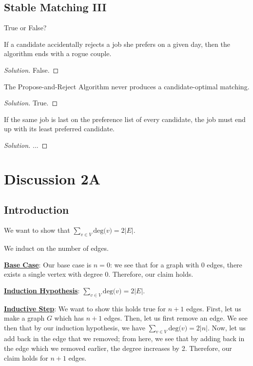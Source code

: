 \documentclass[openany]{book}
\newenvironment{solution}{\begin{proof}[Solution]}{\end{proof}}
\let\oldsum\sum
\renewcommand{\sum}[2]{\oldsum\limits_{#1}^{#2}}
\begin{document}
\section{Stable Matching III}
True or False?
\begin{hw}
	If a candidate accidentally rejects a job she prefers on a given day, then the algorithm ends with a rogue couple.
\end{hw}
\begin{solution}
	False.
\end{solution}
\begin{hw}
	The Propose-and-Reject Algorithm never produces a candidate-optimal matching.
\end{hw}
\begin{solution}
	True.
\end{solution}
\begin{hw}
	If the same job is last on the preference list of every candidate, the job must end up with its least preferred candidate.
\end{hw}
\begin{solution}
	...
\end{solution}

\chapter{Discussion 2A}
\section{Introduction}
We want to show that $\sum{v\in V}{} \text{deg($v$)} = 2 \lvert E \rvert$.

We induct on the number of edges.

\textbf{\underline{Base Case}}: Our base case is $n=0$: we see that for a graph with $0$ edges, there exists a single vertex with degree $0$. Therefore, our claim holds.

\textbf{\underline{Induction Hypothesis}}: $\sum{v \in V}{} \text{deg($v$)} = 2\lvert E \rvert$.

\textbf{\underline{Inductive Step}}: We want to show this holds true for $n+1$ edges. First, let us make a graph $G$ which has $n+1$ edges. Then, let us first remove an edge. We see then that by our induction hypothesis, we have $\sum{v \in V}{} \text{deg($v$)}=2 \lvert n \rvert$. Now, let us add back in the edge that we removed; from here, we see that by adding back in the edge which we removed earlier, the degree increases by 2. Therefore, our claim holds for $n+1$ edges.
\end{document}

